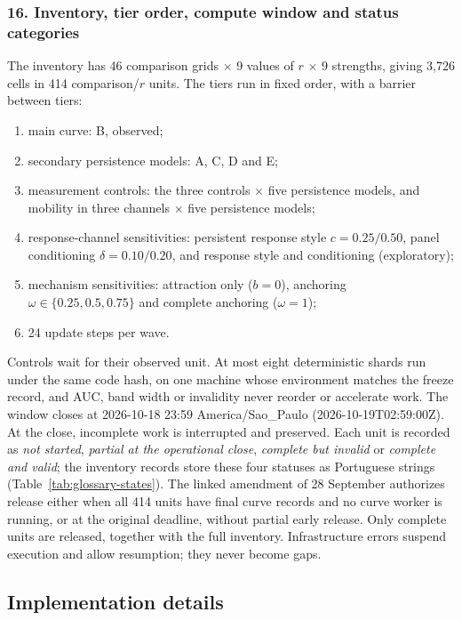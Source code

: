 \subsubsection*{16. Inventory, tier order, compute window and status categories}
The inventory has 46 comparison grids $\times$ 9 values of $r$ $\times$ 9 strengths, giving 3,726 cells in 414 comparison/$r$ units. The tiers run in fixed order, with a barrier between tiers:
\begin{enumerate}
\item main curve: B, observed;
\item secondary persistence models: A, C, D and E;
\item measurement controls: the three controls $\times$ five persistence models, and mobility in three channels $\times$ five persistence models;
\item response-channel sensitivities: persistent response style $c=0.25/0.50$, panel conditioning $\delta=0.10/0.20$, and response style and conditioning (exploratory);
\item mechanism sensitivities: attraction only ($b=0$), anchoring $\omega\in\{0.25,0.5,0.75\}$ and complete anchoring ($\omega=1$);
\item 24 update steps per wave.
\end{enumerate}
Controls wait for their observed unit. At most eight deterministic shards run under the same code hash, on one machine whose environment matches the freeze record, and AUC, band width or invalidity never reorder or accelerate work. The window closes at 2026-10-18 23:59 America/Sao\_Paulo (2026-10-19T02:59:00Z). At the close, incomplete work is interrupted and preserved. Each unit is recorded as \emph{not started}, \emph{partial at the operational close}, \emph{complete but invalid} or \emph{complete and valid}; the inventory records store these four statuses as Portuguese strings (Table~\ref{tab:glossary-states}). The linked amendment of 28 September authorizes release either when all 414 units have final curve records and no curve worker is running, or at the original deadline, without partial early release. %
Only complete units are released, together with the full inventory. %
Infrastructure errors suspend execution and allow resumption; they never become gaps.

\subsection{Implementation details}

